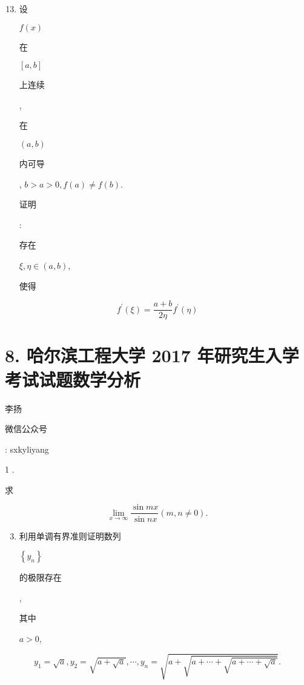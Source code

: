 \documentclass[10pt]{article}
\begin{document}
\begin{enumerate}
  \setcounter{enumi}{12}
  \item \begin{CJK}{UTF8}{mj}设\end{CJK} $f(x)$ \begin{CJK}{UTF8}{mj}在\end{CJK} $[a, b]$ \begin{CJK}{UTF8}{mj}上连续\end{CJK}, \begin{CJK}{UTF8}{mj}在\end{CJK} $(a, b)$ \begin{CJK}{UTF8}{mj}内可导\end{CJK}, $b>a>0, f(a) \neq f(b)$. \begin{CJK}{UTF8}{mj}证明\end{CJK}: \begin{CJK}{UTF8}{mj}存在\end{CJK} $\xi, \eta \in(a, b)$, \begin{CJK}{UTF8}{mj}使得\end{CJK}
\end{enumerate}
$$
f^{\prime}(\xi)=\frac{a+b}{2 \eta} f^{\prime}(\eta)
$$

\section{8. 哈尔滨工程大学 2017 年研究生入学考试试题数学分析}
\begin{CJK}{UTF8}{mj}李扬\end{CJK}

\begin{CJK}{UTF8}{mj}微信公众号\end{CJK}: sxkyliyang

1 . \begin{CJK}{UTF8}{mj}求\end{CJK}
$$
\lim _{x \rightarrow \infty} \frac{\sin m x}{\sin n x}(m, n \neq 0) .
$$

\begin{enumerate}
  \setcounter{enumi}{2}
  \item \begin{CJK}{UTF8}{mj}利用单调有界准则证明数列\end{CJK} $\left\{y_{n}\right\}$ \begin{CJK}{UTF8}{mj}的极限存在\end{CJK}, \begin{CJK}{UTF8}{mj}其中\end{CJK} $a>0$,
\end{enumerate}
$$
y_{1}=\sqrt{a}, y_{2}=\sqrt{a+\sqrt{a}}, \cdots, y_{n}=\sqrt{a+\sqrt{a+\cdots+\sqrt{a+\cdots+\sqrt{a}}}} .
$$
\end{document}
